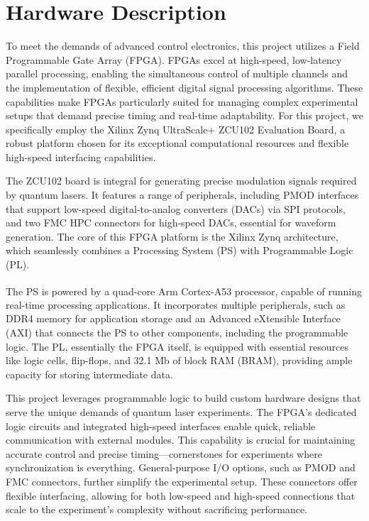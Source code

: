 \section{Hardware Description}

To meet the demands of advanced control electronics, this project utilizes a Field Programmable Gate Array (FPGA). FPGAs excel at high-speed, low-latency parallel processing, enabling the simultaneous control of multiple channels and the implementation of flexible, efficient digital signal processing algorithms. These capabilities make FPGAs particularly suited for managing complex experimental setups that demand precise timing and real-time adaptability. For this project, we specifically employ the Xilinx Zynq UltraScale+ ZCU102 Evaluation Board, a robust platform chosen for its exceptional computational resources and flexible high-speed interfacing capabilities.

The ZCU102 board is integral for generating precise modulation signals required by quantum lasers. It features a range of peripherals, including PMOD interfaces that support low-speed digital-to-analog converters (DACs) via SPI protocols, and two FMC HPC connectors for high-speed DACs, essential for waveform generation. The core of this FPGA platform is the Xilinx Zynq architecture, which seamlessly combines a Processing System (PS) with Programmable Logic (PL).

The PS is powered by a quad-core Arm\textsuperscript{\textregistered} Cortex\textsuperscript{\textregistered}-A53 processor, capable of running real-time processing applications. It incorporates multiple peripherals, such as DDR4 memory for application storage and an Advanced eXtensible Interface (AXI) that connects the PS to other components, including the programmable logic. The PL, essentially the FPGA itself, is equipped with essential resources like logic cells, flip-flops, and 32.1 Mb of block RAM (BRAM), providing ample capacity for storing intermediate data.

This project leverages programmable logic to build custom hardware designs that serve the unique demands of quantum laser experiments. The FPGA's dedicated logic circuits and integrated high-speed interfaces enable quick, reliable communication with external modules. This capability is crucial for maintaining accurate control and precise timing—cornerstones for experiments where synchronization is everything. General-purpose I/O options, such as PMOD and FMC connectors, further simplify the experimental setup. These connectors offer flexible interfacing, allowing for both low-speed and high-speed connections that scale to the experiment's complexity without sacrificing performance.

